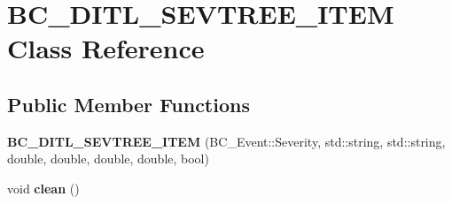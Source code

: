 \hypertarget{class_b_c___d_i_t_l___s_e_v_t_r_e_e___i_t_e_m}{}\section{B\+C\+\_\+\+D\+I\+T\+L\+\_\+\+S\+E\+V\+T\+R\+E\+E\+\_\+\+I\+T\+EM Class Reference}
\label{class_b_c___d_i_t_l___s_e_v_t_r_e_e___i_t_e_m}
\subsection*{Public Member Functions}
\begin{DoxyCompactItemize}
\item 
{\bfseries B\+C\+\_\+\+D\+I\+T\+L\+\_\+\+S\+E\+V\+T\+R\+E\+E\+\_\+\+I\+T\+EM} (B\+C\+\_\+\+Event\+::\+Severity, std\+::string, std\+::string, double, double, double, double, bool)\hypertarget{class_b_c___d_i_t_l___s_e_v_t_r_e_e___i_t_e_m_a04966b5ef09bc4ac678e389c8d459d3a}{}\label{class_b_c___d_i_t_l___s_e_v_t_r_e_e___i_t_e_m_a04966b5ef09bc4ac678e389c8d459d3a}

\item 
void {\bfseries clean} ()\hypertarget{class_b_c___d_i_t_l___s_e_v_t_r_e_e___i_t_e_m_af9e3ddafe2a929b9d7bdd636affa403b}{}\label{class_b_c___d_i_t_l___s_e_v_t_r_e_e___i_t_e_m_af9e3ddafe2a929b9d7bdd636affa403b}

\end{DoxyCompactItemize}
